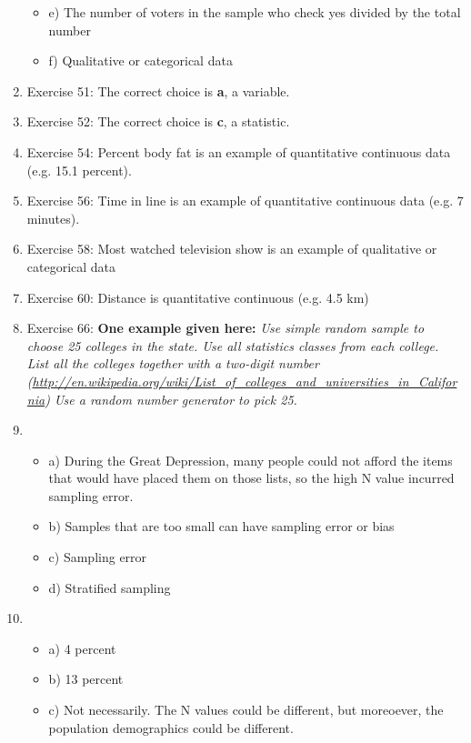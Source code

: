 \documentclass{article}
\begin{document}
\begin{enumerate}
\begin{itemize}
\item e) The number of voters in the sample who check yes divided by the total number
\item f) Qualitative or categorical data
\end{itemize}
\item Exercise 51: The correct choice is \textbf{a}, a variable.
\item Exercise 52: The correct choice is \textbf{c}, a statistic.
\item Exercise 54: Percent body fat is an example of quantitative continuous data (e.g. 15.1 percent).
\item Exercise 56: Time in line is an example of quantitative continuous data (e.g. 7 minutes).
\item Exercise 58: Most watched television show is an example of qualitative or categorical data
\item Exercise 60: Distance is quantitative continuous (e.g. 4.5 km)
\item Exercise 66: \textbf{One example given here:}
\textit{Use simple random sample to choose 25 colleges in the state. Use all statistics classes from each college. List all the colleges together with a two-digit number (\url{http://en.wikipedia.org/wiki/List_of_colleges_and_universities_in_California}) Use a random number generator to pick 25.}
\item 
\begin{itemize}
\item a) During the Great Depression, many people could not afford the items that would have placed them on those lists, so the high N value incurred sampling error.
\item b) Samples that are too small can have sampling error or bias
\item c) Sampling error
\item d) Stratified sampling
\end{itemize}
\item 
\begin{itemize}
\item a) 4 percent
\item b) 13 percent
\item c) Not necessarily.  The N values could be different, but moreoever, the population demographics could be different.
\end{itemize}
\end{enumerate}
\end{document}
